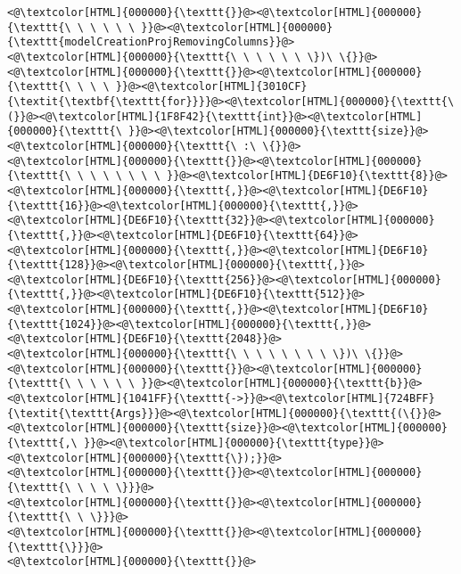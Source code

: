 \begin{lstlisting}
<@\textcolor[HTML]{000000}{\texttt{}}@><@\textcolor[HTML]{000000}{\texttt{\ \ \ \ \ \ }}@><@\textcolor[HTML]{000000}{\texttt{modelCreationProjRemovingColumns}}@>
<@\textcolor[HTML]{000000}{\texttt{\ \ \ \ \ \ \})\ \{}}@>
<@\textcolor[HTML]{000000}{\texttt{}}@><@\textcolor[HTML]{000000}{\texttt{\ \ \ \ }}@><@\textcolor[HTML]{3010CF}{\textit{\textbf{\texttt{for}}}}@><@\textcolor[HTML]{000000}{\texttt{\ (}}@><@\textcolor[HTML]{1F8F42}{\texttt{int}}@><@\textcolor[HTML]{000000}{\texttt{\ }}@><@\textcolor[HTML]{000000}{\texttt{size}}@><@\textcolor[HTML]{000000}{\texttt{\ :\ \{}}@>
<@\textcolor[HTML]{000000}{\texttt{}}@><@\textcolor[HTML]{000000}{\texttt{\ \ \ \ \ \ \ \ }}@><@\textcolor[HTML]{DE6F10}{\texttt{8}}@><@\textcolor[HTML]{000000}{\texttt{,}}@><@\textcolor[HTML]{DE6F10}{\texttt{16}}@><@\textcolor[HTML]{000000}{\texttt{,}}@><@\textcolor[HTML]{DE6F10}{\texttt{32}}@><@\textcolor[HTML]{000000}{\texttt{,}}@><@\textcolor[HTML]{DE6F10}{\texttt{64}}@><@\textcolor[HTML]{000000}{\texttt{,}}@><@\textcolor[HTML]{DE6F10}{\texttt{128}}@><@\textcolor[HTML]{000000}{\texttt{,}}@><@\textcolor[HTML]{DE6F10}{\texttt{256}}@><@\textcolor[HTML]{000000}{\texttt{,}}@><@\textcolor[HTML]{DE6F10}{\texttt{512}}@><@\textcolor[HTML]{000000}{\texttt{,}}@><@\textcolor[HTML]{DE6F10}{\texttt{1024}}@><@\textcolor[HTML]{000000}{\texttt{,}}@><@\textcolor[HTML]{DE6F10}{\texttt{2048}}@>
<@\textcolor[HTML]{000000}{\texttt{\ \ \ \ \ \ \ \ \})\ \{}}@>
<@\textcolor[HTML]{000000}{\texttt{}}@><@\textcolor[HTML]{000000}{\texttt{\ \ \ \ \ \ }}@><@\textcolor[HTML]{000000}{\texttt{b}}@><@\textcolor[HTML]{1041FF}{\texttt{->}}@><@\textcolor[HTML]{724BFF}{\textit{\texttt{Args}}}@><@\textcolor[HTML]{000000}{\texttt{(\{}}@><@\textcolor[HTML]{000000}{\texttt{size}}@><@\textcolor[HTML]{000000}{\texttt{,\ }}@><@\textcolor[HTML]{000000}{\texttt{type}}@><@\textcolor[HTML]{000000}{\texttt{\});}}@>
<@\textcolor[HTML]{000000}{\texttt{}}@><@\textcolor[HTML]{000000}{\texttt{\ \ \ \ \}}}@>
<@\textcolor[HTML]{000000}{\texttt{}}@><@\textcolor[HTML]{000000}{\texttt{\ \ \}}}@>
<@\textcolor[HTML]{000000}{\texttt{}}@><@\textcolor[HTML]{000000}{\texttt{\}}}@>
<@\textcolor[HTML]{000000}{\texttt{}}@>
\end{lstlisting}